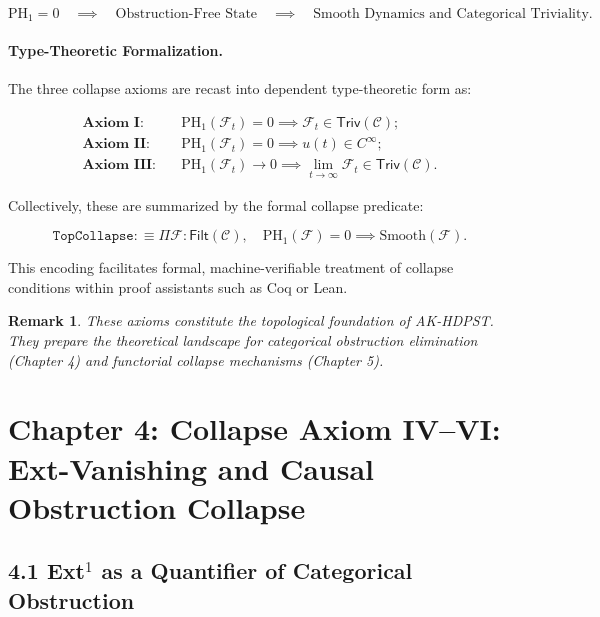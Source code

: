 \documentclass[11pt]{article}
\newtheorem{remark}[theorem]{Remark}
\begin{document}
\[
\mathrm{PH}_1 = 0 \quad \implies \quad \text{Obstruction-Free State} \quad \implies \quad \text{Smooth Dynamics and Categorical Triviality}.
\]

\paragraph{Type-Theoretic Formalization.}
The three collapse axioms are recast into dependent type-theoretic form as:

\begin{align*}
\textbf{Axiom I:} &\quad \mathrm{PH}_1(\mathcal{F}_t) = 0 \implies \mathcal{F}_t \in \mathsf{Triv}(\mathcal{C}); \\
\textbf{Axiom II:} &\quad \mathrm{PH}_1(\mathcal{F}_t) = 0 \implies u(t) \in C^\infty; \\
\textbf{Axiom III:} &\quad \mathrm{PH}_1(\mathcal{F}_t) \longrightarrow 0 \implies \lim_{t \to \infty} \mathcal{F}_t \in \mathsf{Triv}(\mathcal{C}).
\end{align*}

Collectively, these are summarized by the formal collapse predicate:

\[
\texttt{TopCollapse} :\equiv \Pi \mathcal{F} : \mathsf{Filt}(\mathcal{C}), \quad \mathrm{PH}_1(\mathcal{F}) = 0 \implies \mathrm{Smooth}(\mathcal{F}).
\]

This encoding facilitates formal, machine-verifiable treatment of collapse conditions within proof assistants such as Coq or Lean.

\begin{remark}
These axioms constitute the topological foundation of AK-HDPST. They prepare the theoretical landscape for categorical obstruction elimination (Chapter 4) and functorial collapse mechanisms (Chapter 5).
\end{remark}



\section{Chapter 4: Collapse Axiom IV–VI: Ext-Vanishing and Causal Obstruction Collapse}

\subsection*{4.1 Ext$^1$ as a Quantifier of Categorical Obstruction}
\end{document}
